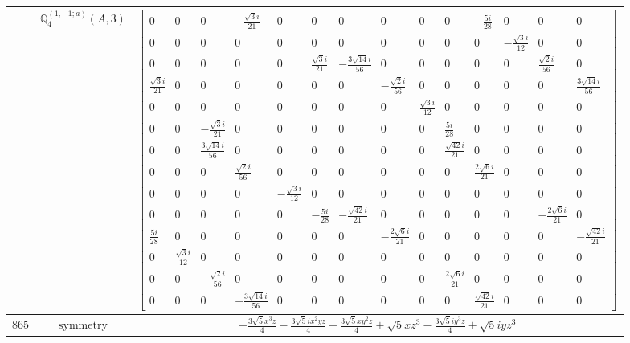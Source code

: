 \documentclass[fleqn,8pt,landscape]{jsarticle}
\begin{document}
\begin{longtable}{ccc}
$  $ & $ \mathbb{Q}_{4}^{(1,-1;a)}(A,3) $ & $ \begin{bmatrix} 0 & 0 & 0 & - \frac{\sqrt{3} i}{21} & 0 & 0 & 0 & 0 & 0 & 0 & - \frac{5 i}{28} & 0 & 0 & 0 \\ 0 & 0 & 0 & 0 & 0 & 0 & 0 & 0 & 0 & 0 & 0 & - \frac{\sqrt{3} i}{12} & 0 & 0 \\ 0 & 0 & 0 & 0 & 0 & \frac{\sqrt{3} i}{21} & - \frac{3 \sqrt{14} i}{56} & 0 & 0 & 0 & 0 & 0 & \frac{\sqrt{2} i}{56} & 0 \\ \frac{\sqrt{3} i}{21} & 0 & 0 & 0 & 0 & 0 & 0 & - \frac{\sqrt{2} i}{56} & 0 & 0 & 0 & 0 & 0 & \frac{3 \sqrt{14} i}{56} \\ 0 & 0 & 0 & 0 & 0 & 0 & 0 & 0 & \frac{\sqrt{3} i}{12} & 0 & 0 & 0 & 0 & 0 \\ 0 & 0 & - \frac{\sqrt{3} i}{21} & 0 & 0 & 0 & 0 & 0 & 0 & \frac{5 i}{28} & 0 & 0 & 0 & 0 \\ 0 & 0 & \frac{3 \sqrt{14} i}{56} & 0 & 0 & 0 & 0 & 0 & 0 & \frac{\sqrt{42} i}{21} & 0 & 0 & 0 & 0 \\ 0 & 0 & 0 & \frac{\sqrt{2} i}{56} & 0 & 0 & 0 & 0 & 0 & 0 & \frac{2 \sqrt{6} i}{21} & 0 & 0 & 0 \\ 0 & 0 & 0 & 0 & - \frac{\sqrt{3} i}{12} & 0 & 0 & 0 & 0 & 0 & 0 & 0 & 0 & 0 \\ 0 & 0 & 0 & 0 & 0 & - \frac{5 i}{28} & - \frac{\sqrt{42} i}{21} & 0 & 0 & 0 & 0 & 0 & - \frac{2 \sqrt{6} i}{21} & 0 \\ \frac{5 i}{28} & 0 & 0 & 0 & 0 & 0 & 0 & - \frac{2 \sqrt{6} i}{21} & 0 & 0 & 0 & 0 & 0 & - \frac{\sqrt{42} i}{21} \\ 0 & \frac{\sqrt{3} i}{12} & 0 & 0 & 0 & 0 & 0 & 0 & 0 & 0 & 0 & 0 & 0 & 0 \\ 0 & 0 & - \frac{\sqrt{2} i}{56} & 0 & 0 & 0 & 0 & 0 & 0 & \frac{2 \sqrt{6} i}{21} & 0 & 0 & 0 & 0 \\ 0 & 0 & 0 & - \frac{3 \sqrt{14} i}{56} & 0 & 0 & 0 & 0 & 0 & 0 & \frac{\sqrt{42} i}{21} & 0 & 0 & 0 \end{bmatrix} $ \\ \hline
$ 865 $ & $ \text{symmetry} $ & $ - \frac{3 \sqrt{5} x^{3} z}{4} - \frac{3 \sqrt{5} i x^{2} y z}{4} - \frac{3 \sqrt{5} x y^{2} z}{4} + \sqrt{5} x z^{3} - \frac{3 \sqrt{5} i y^{3} z}{4} + \sqrt{5} i y z^{3} $ \\

\end{longtable}
\end{document}
